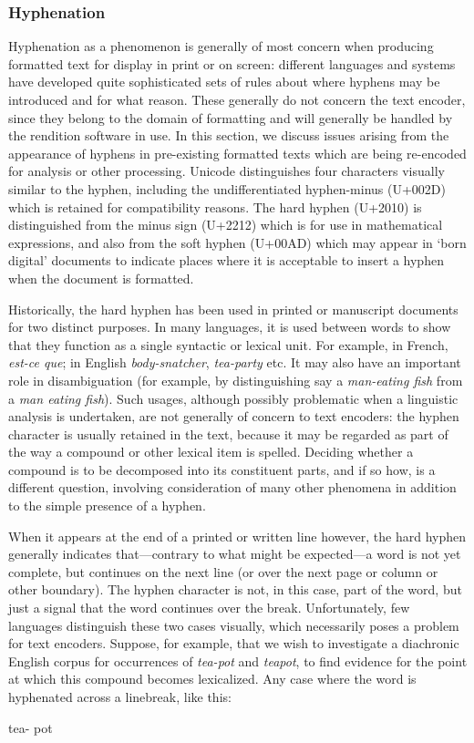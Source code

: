 \subsubsection[{Hyphenation}]{Hyphenation}\label{COPU-2}\par
Hyphenation as a phenomenon is generally of most concern when producing formatted text for display in print or on screen: different languages and systems have developed quite sophisticated sets of rules about where hyphens may be introduced and for what reason. These generally do not concern the text encoder, since they belong to the domain of formatting and will generally be handled by the rendition software in use. In this section, we discuss issues arising from the appearance of hyphens in pre-existing formatted texts which are being re-encoded for analysis or other processing. Unicode distinguishes four characters visually similar to the hyphen, including the undifferentiated hyphen-minus (U+002D) which is retained for compatibility reasons. The hard hyphen (U+2010) is distinguished from the minus sign (U+2212) which is for use in mathematical expressions, and also from the soft hyphen (U+00AD) which may appear in ‘born digital’ documents to indicate places where it is acceptable to insert a hyphen when the document is formatted.\par
Historically, the hard hyphen has been used in printed or manuscript documents for two distinct purposes. In many languages, it is used between words to show that they function as a single syntactic or lexical unit. For example, in French, \textit{est-ce que}; in English \textit{body-snatcher}, \textit{tea-party} etc. It may also have an important role in disambiguation (for example, by distinguishing say a \textit{man-eating fish} from a \textit{man eating fish}). Such usages, although possibly problematic when a linguistic analysis is undertaken, are not generally of concern to text encoders: the hyphen character is usually retained in the text, because it may be regarded as part of the way a compound or other lexical item is spelled. Deciding whether a compound is to be decomposed into its constituent parts, and if so how, is a different question, involving consideration of many other phenomena in addition to the simple presence of a hyphen.\par
When it appears at the end of a printed or written line however, the hard hyphen generally indicates that—contrary to what might be expected—a word is not yet complete, but continues on the next line (or over the next page or column or other boundary). The hyphen character is not, in this case, part of the word, but just a signal that the word continues over the break. Unfortunately, few languages distinguish these two cases visually, which necessarily poses a problem for text encoders. Suppose, for example, that we wish to investigate a diachronic English corpus for occurrences of \textit{tea-pot} and \textit{teapot}, to find evidence for the point at which this compound becomes lexicalized. Any case where the word is hyphenated across a linebreak, like this: \par\hfill\bgroup\exampleFont\vskip 10pt\begin{shaded}
\obeyspaces tea-\newline
pot\end{shaded}
